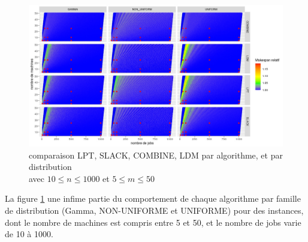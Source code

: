 \documentclass[a4paper,12pt]{report}
\theoremstyle{plain}				%
\theoremstyle{definition}				%
\begin{document}
\begin{figure}
{\centering
\includegraphics[width=\columnwidth]{9_resultatComparaisonAlgoDistributions.jpeg}
\caption{comparaison LPT, SLACK, COMBINE, LDM par algorithme, et par distribution\\
\hspace{\linewidth} avec $10\leq n \leq 1000$ et $5\leq m \leq 50$}
\label{fig:resultatComparaisonAlgoDistributions}
\par}
\end{figure}

La figure \ref{fig:resultatComparaisonAlgoDistributions} une infime partie 
  du comportement de chaque algorithme par famille de distribution 
  (Gamma, NON-UNIFORME et UNIFORME) 
  pour des instances, dont le nombre de machines est compris entre 5 et 50, 
  et le nombre de jobs varie de 10 à 1000. 
\end{document}

